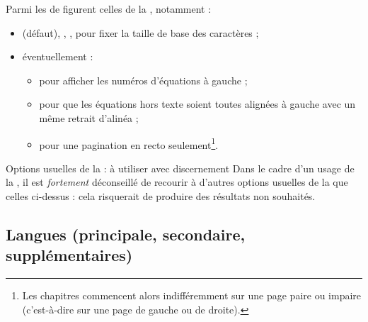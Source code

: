 Parmi les  de \yatcl figurent celles de la ,
notamment :
\begin{itemize}
\item{}%
  \docAuxKey{10pt} (défaut), \docAuxKey{11pt}, \docAuxKey{12pt}, pour fixer
  la taille de base des caractères ;
\item éventuellement :
  \begin{itemize}
  \item{}%
     pour afficher les numéros d'équations à gauche ;
  \item{}%
     pour que les équations hors texte soient toutes
    alignées à gauche avec un même retrait d'alinéa ;
  \item%
     pour une \gls{pagination} en recto
    seulement\footnote{Les chapitres commencent alors indifféremment sur une
      page paire ou impaire (c'est-à-dire sur une page
      de gauche ou de droite).}.
  \end{itemize}
\end{itemize}
\begin{dbwarning}{Options usuelles de la  : à utiliser avec
    discernement}{}
  Dans le cadre d'un usage de la \yatCl, il est \emph{fortement} déconseillé de
  recourir à d'autres options usuelles de la  que celles
  ci-dessus : cela risquerait de produire des résultats non souhaités.
\end{dbwarning}

%

\subsection{Langues (principale, secondaire, supplémentaires)}
\label{sec-langues}%
%
%
%
%
%

